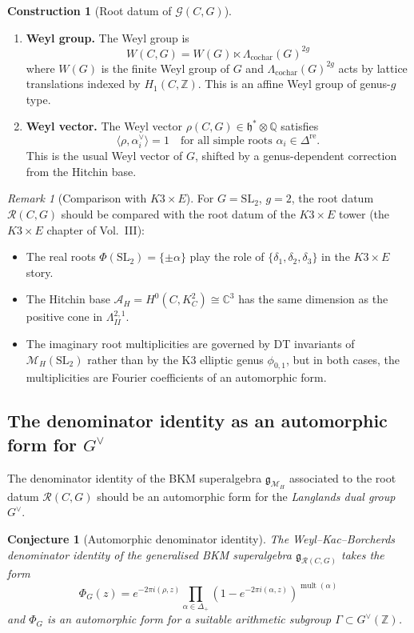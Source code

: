 \documentclass[11pt]{article}
\newtheorem{conjecture}[theorem]{Conjecture}
\theoremstyle{definition}
\newtheorem{construction}[theorem]{Construction}
\theoremstyle{remark}
\newtheorem{remark}[theorem]{Remark}
\newcommand{\frakg}{\mathfrak{g}}
\newcommand{\frakh}{\mathfrak{h}}
\newcommand{\cA}{\mathcal{A}}
\newcommand{\cM}{\mathcal{M}}
\DeclareMathOperator{\mult}{mult}
\begin{document}
\begin{construction}[Root datum of $\mathcal{G}(C, G)$]
\begin{enumerate}[label=(\roman*)]
 \item \textbf{Weyl group.} The Weyl group is
 \[
 W(C, G) = W(G) \ltimes \Lambda_{\mathrm{cochar}}(G)^{2g}
 \]
 where $W(G)$ is the finite Weyl group of $G$ and $\Lambda_{\mathrm{cochar}}(G)^{2g}$ acts by lattice translations indexed by $H_1(C, \mathbb{Z})$. This is an affine Weyl group of genus-$g$ type.

 \item \textbf{Weyl vector.} The Weyl vector $\rho(C, G) \in \frakh^* \otimes \mathbb{Q}$ satisfies
 \[
 \langle \rho, \alpha_i^\vee \rangle = 1 \quad \text{for all simple roots } \alpha_i \in \Delta^{\mathrm{re}}.
 \]
 This is the usual Weyl vector of $G$, shifted by a genus-dependent correction from the Hitchin base.
\end{enumerate}
\end{construction}

\begin{remark}[Comparison with $K3 \times E$]
\label{rem:comparison-k3e}
For $G = \mathrm{SL}_2$, $g = 2$, the root datum $\mathcal{R}(C, G)$ should be compared with the root datum of the $K3 \times E$ tower (the $K3 \times E$ chapter of Vol.~III):
\begin{itemize}
 \item The real roots $\Phi(\mathrm{SL}_2) = \{\pm\alpha\}$ play the role of $\{\delta_1, \delta_2, \delta_3\}$ in the $K3 \times E$ story.
 \item The Hitchin base $\cA_H = H^0(C, K_C^2) \cong \mathbb{C}^3$ has the same dimension as the positive cone in $\Lambda^{2,1}_{II}$.
 \item The imaginary root multiplicities are governed by DT invariants of $\cM_H(\mathrm{SL}_2)$ rather than by the K3 elliptic genus $\phi_{0,1}$, but in both cases, the multiplicities are Fourier coefficients of an automorphic form.
\end{itemize}
\end{remark}

\subsection{The denominator identity as an automorphic form for $G^\vee$}

The denominator identity of the BKM superalgebra $\frakg_{\cM_H}$ associated to the root datum $\mathcal{R}(C, G)$ should be an automorphic form for the \emph{Langlands dual group} $G^\vee$.

\begin{conjecture}[Automorphic denominator identity]
\label{conj:automorphic-denom}
The Weyl--Kac--Borcherds denominator identity of the generalised BKM superalgebra $\frakg_{\mathcal{R}(C,G)}$ takes the form
\[
 \Phi_G(z) = e^{-2\pi i (\rho, z)} \prod_{\alpha \in \Delta_+} (1 - e^{-2\pi i (\alpha, z)})^{\mult(\alpha)}
\]
and $\Phi_G$ is an automorphic form for a suitable arithmetic subgroup $\Gamma \subset G^\vee(\mathbb{Z})$.
\end{conjecture}
\end{document}
